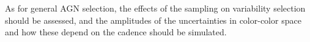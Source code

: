 As for general AGN selection, the effects of the sampling on variability selection
should be assessed, and the amplitudes of the uncertainties in color-color space
and how these depend on the cadence should be simulated.

%
%
%
%

\navigationbar

